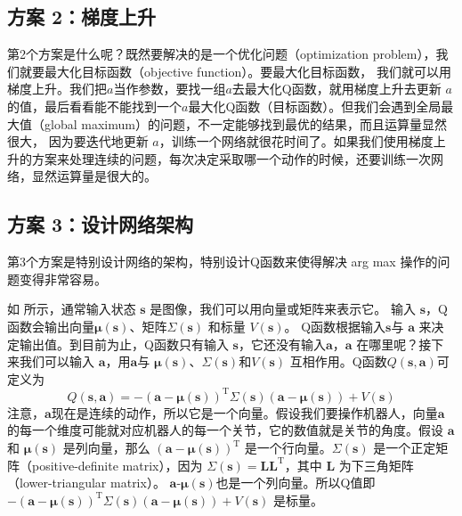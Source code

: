 \subsection{方案 2：梯度上升}
第2个方案是什么呢？既然要解决的是一个优化问题（optimization problem），我们就要最大化目标函数（objective function）。要最大化目标函数， 我们就可以用梯度上升。我们把$a$当作参数，要找一组$a$去最大化Q函数，就用梯度上升去更新 $a$ 的值，最后看看能不能找到一个$a$最大化Q函数（目标函数）。但我们会遇到全局最大值（global maximum）的问题，不一定能够找到最优的结果，而且运算量显然很大， 因为要迭代地更新 $a$，训练一个网络就很花时间了。如果我们使用梯度上升的方案来处理连续的问题，每次决定采取哪一个动作的时候，还要训练一次网络，显然运算量是很大的。

\subsection{方案 3：设计网络架构} 
第3个方案是特别设计网络的架构，特别设计Q函数来使得解决 arg max 操作的问题变得非常容易。

如 所示，通常输入状态 $\boldsymbol{s}$ 是图像，我们可以用向量或矩阵来表示它。
  输入 $\boldsymbol{s}$，Q函数会输出向量$\pmb{\mu}(\boldsymbol{s})$、矩阵$\pmb{\varSigma}(\boldsymbol{s})$ 和标量 $V(\boldsymbol{s})$。
  Q函数根据输入$\boldsymbol{s}$与 $\boldsymbol{a}$ 来决定输出值。到目前为止，Q函数只有输入 $\boldsymbol{s}$，它还没有输入$\boldsymbol{a}$，$\boldsymbol{a}$ 在哪里呢？接下来我们可以输入 $\boldsymbol{a}$，用$\boldsymbol{a}$与 $\pmb{\mu}(\boldsymbol{s})$、$\pmb{\varSigma}(\boldsymbol{s})$和$V(\boldsymbol{s})$ 互相作用。Q函数$Q(\boldsymbol{s},\boldsymbol{a})$可定义为
  \begin{equation}
    \label{eq:}
    Q(\boldsymbol{s},\boldsymbol{a})=-(\boldsymbol{a}-\pmb{\mu}(\boldsymbol{s}))^{\mathrm{T}} \pmb{\varSigma}(\boldsymbol{s})(\boldsymbol{a}-\pmb{\mu}(\boldsymbol{s}))+V(\boldsymbol{s})
  \end{equation}
  注意，$\boldsymbol{a}$现在是连续的动作，所以它是一个向量。假设我们要操作机器人，向量$\boldsymbol{a}$的每一个维度可能就对应机器人的每一个关节，它的数值就是关节的角度。假设 $\boldsymbol{a}$ 和 $\pmb{\mu}(\boldsymbol{s})$
  是列向量，那么 $(\boldsymbol{a}-\pmb{\mu}(\boldsymbol{s}))^{\mathrm{T}}$ 是一个行向量。$\pmb{\varSigma}(\boldsymbol{s})$ 是一个正定矩阵（positive-definite matrix），因为 $\pmb{\varSigma}(\boldsymbol{s}) = \boldsymbol{L}\boldsymbol{L}^{\mathrm{T}}$，其中 $\boldsymbol{L}$ 为下三角矩阵（lower-triangular matrix）。 $\boldsymbol{a}$-$\pmb{\mu}(\boldsymbol{s})$也是一个列向量。所以Q值即
   $-(\boldsymbol{a}-\pmb{\mu}(\boldsymbol{s}))^{\mathrm{T}} \pmb{\varSigma}(\boldsymbol{s})(\boldsymbol{a}-\pmb{\mu}(\boldsymbol{s}))+V(\boldsymbol{s})$ 是标量。
  
